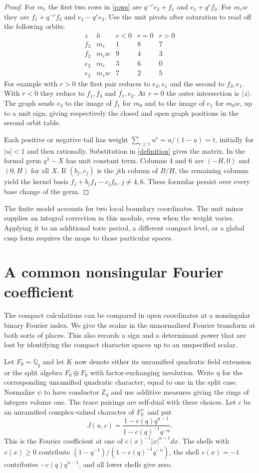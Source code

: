 \documentclass[11pt]{article}
\begin{document}
\begin{proof}
For $m_r$ the first two rows in \eqref{rows} are
$q^{-r}e_3+f_1$ and $e_1+q^r f_3$.
For $m_rw$ they are $f_1+q^{-r}f_3$ and $e_1-q^re_3$.
Use the unit pivots after saturation to read off the following orbits:
\[
\begin{array}{cc|ccc}
z&h&r<0&r=0&r>0\\\hline
 f_2&m_r&1&8&7\\
 f_2&m_rw&9&4&3\\
 e_2&m_r&3&6&0\\
 e_2&m_rw&7&2&5
\end{array}
\]
For example with $r>0$ the first pair reduces to $e_3,e_1$ and
the second to $f_3,e_1$. With $r<0$ they reduce to $f_1,f_3$
and $f_1,e_3$. At $r=0$ the outer intersection is $\langle z\rangle$.
The graph sends $e_3$ to the image of $f_1$ for $m_0$ and to the
image of $e_1$ for $m_0w$, up to a unit sign, giving respectively
the closed and open graph positions in the second orbit table.

Each positive or negative tail has weight
$\sum_{r\ge1}u^r=u/(1-u)=t$, initially for $|u|<1$ and then
rationally. Substitution in \eqref{definition} gives the matrix.
In the formal germ $q^3-X$ has unit constant term. Columns 4 and 6
are $(-H,0)$ and $(0,H)$ for all $X$. If $(b_j,c_j)$ is the $j$th
column of $B/H$, the remaining columns yield the kernel basis
$f_j+b_j f_4-c_j f_6$, $j\ne4,6$. These formulas persist over every
base change of the germ.
\end{proof}

The finite model accounts for two local boundary coordinates. The unit
minor supplies an integral correction in this module, even when the
weight varies. Applying it to an additional toric period, a different
compact level, or a global cusp form requires the maps to those
particular spaces.

\section{A common nonsingular Fourier coefficient}
The compact calculations can be compared in open coordinates at a
nonsingular binary Fourier index. We give the scalar in the
unnormalized Fourier transform at both sorts of places. This also
records a sign and a determinant power that are lost by identifying
the compact character spaces up to an unspecified scalar.

Let $F_0=\mathbb Q_q$ and let $K$ now denote either its unramified
quadratic field extension or the split algebra $F_0\oplus F_0$ with
factor-exchanging involution. Write $\eta$ for the corresponding
unramified quadratic character, equal to one in the split case.
Normalize $\psi$ to have conductor $\mathbb Z_q$ and use additive
measures giving the rings of integers volume one. The trace pairings
are self-dual with these choices. Let $c$ be an unramified
complex-valued character of $F_0^\times$ and put
\[
 J(u,c)=\frac{1-c(q)q^{u-1}}{1-c(q)^{-1}q^{-u}} .
\]
This is the Fourier coefficient at one of
$c(x)^{-1}|x|^{u-1}dx$. The shells with $v(x)\ge0$ contribute
$(1-q^{-1})/(1-c(q)^{-1}q^{-u})$, the shell $v(x)=-1$
contributes $-c(q)q^{u-1}$, and all lower shells give zero.
\end{document}
